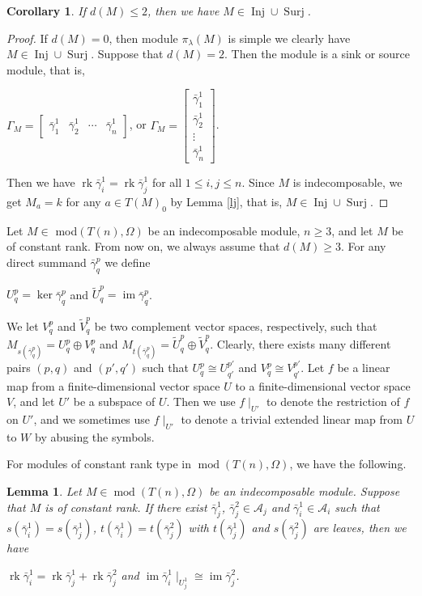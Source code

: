 \documentclass[a4paper,12pt]{amsart}
\newcommand{\cA}{\mathcal{A}}
\newcommand{\bg}{\bar{\gamma}}
\DeclareMathOperator{\rk}{rk}
\DeclareMathOperator{\modd}{mod}
\DeclareMathOperator{\im}{im}
\DeclareMathOperator{\Inj}{Inj}
\DeclareMathOperator{\Sur}{Surj}
\newtheorem{Lemma}[proposition]{Lemma}
\newtheorem{corollary}[proposition]{Corollary}
\begin{document}
\begin{corollary}\label{dm}
If $d(M)\leq 2$,  then we have $M\in\Inj\cup\Sur$.

\end{corollary}
\begin{proof}
If $d(M)=0$, then module $\pi_\lambda(M)$ is simple we clearly have $M\in\Inj\cup\Sur$. Suppose that $d(M)=2$. Then the module is a sink or source module, that is,  
\begin{center}
$\Gamma_M=\begin{bmatrix}
\bg^1_1 & \bg^1_2 & \cdots & \bg^1_n
\end{bmatrix}$, or $\Gamma_M=\begin{bmatrix}
\bg^1_1 \\
 \bg^1_2 \\
  \vdots \\
   \bg^1_n
\end{bmatrix}$.
\end{center}
Then we have $\rk \bg^1_i=\rk \bg^1_j$ for all $1\leq i,j\leq n$. Since $M$ is indecomposable, we get $M_a=k$ for any $a\in T(M)_0$ by Lemma \ref{lj}, that is, $M\in \Inj\cup \Sur$.

\end{proof}


  Let $M\in$ mod$(T(n), \Omega)$ be an indecomposable module, $n\geq 3$, and let $M$ be of constant rank. From now on, we always assume that $d(M)\geq 3$. For any direct summand $\bg^p_q$ we  define
\begin{center}
$U^p_q= \ker \bg^p_q$ and  $\tilde{U}^p_q=\im\bg^p_q$. 
\end{center}
We let $V^p_q$ and $\tilde{V}^p_q$ be two complement vector spaces, respectively,  such that $M_{s(\bg^p_q)}=U^p_q \oplus V^p_q $ and $M_{t(\bg^p_q)}=\tilde{U}^p_q\oplus \tilde{V}^p_q $. Clearly, there exists many different pairs $(p,q)$ and $(p', q')$ such that  $U^{p}_q\cong U^{p'}_{q'}$ and $V^p_q\cong V^{p'}_{q'}$. Let $f$ be a linear map from a finite-dimensional vector space $U$ to  a finite-dimensional vector space $V$, and let $U'$ be a subspace of $U$. Then we use $f\mid_{U'}$ to denote the restriction of $f$ on $U'$, and we sometimes use $f\mid_{U'}$ to denote a trivial extended linear map from $U$ to $W$ by abusing the symbols. 

For modules of constant rank type in $\modd(T(n),\Omega)$, we have the following.

\begin{Lemma}\label{two leaves}
Let $M\in \modd(T(n),\Omega)$ be an indecomposable module. Suppose that $M$ is of constant rank.  If there exist $\bg^1_j$, $\bg^2_j\in \cA_j$ and $\bg^1_i\in \cA_i$ such that $s(\bg^1_i)=s(\bg^1_j)$, $t(\bg^1_i)=t(\bg^2_j)$ with $t(\bg^1_j)$ and $s(\bg^2_j)$ are leaves, then we have 
\begin{center}
$\rk \bg^1_i=\rk \bg^1_j+\rk\bg^2_j $ and $\im \bg^1_i\mid_{U^1_j}\cong \im \bg^2_j$.
\end{center}


\end{Lemma}
\end{document}
